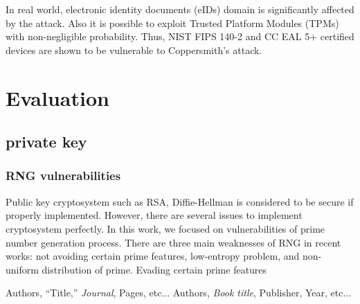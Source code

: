 \documentclass[a4paper]{article}
\begin{document}
In real world, electronic identity documents (eIDs) domain is significantly affected by the attack. Also it is possible to exploit Trusted Platform Modules (TPMs) with non-negligible probability. Thus, NIST FIPS 140-2 and CC EAL 5+ certified devices are shown to be vulnerable to Coppersmith's attack. 


\section{Evaluation}

\subsection{private key}

\subsubsection{RNG vulnerabilities}
Public key cryptosystem such as RSA, Diffie-Hellman is considered to be secure if properly implemented. However, there are several issues to implement cryptosystem perfectly. In this work, we focused on vulnerabilities of prime number generation process. There are three main weaknesses of RNG in recent works: not avoiding certain prime features, low-entropy problem, and non-uniform distribution of prime. 
Evading certain prime features 

\begin{thebibliography}{9}
Authors, ``Title,'' {\em Journal}, Pages, etc...
Authors, {\em Book title}, Publisher, Year, etc...
\end{thebibliography}
\end{document}
